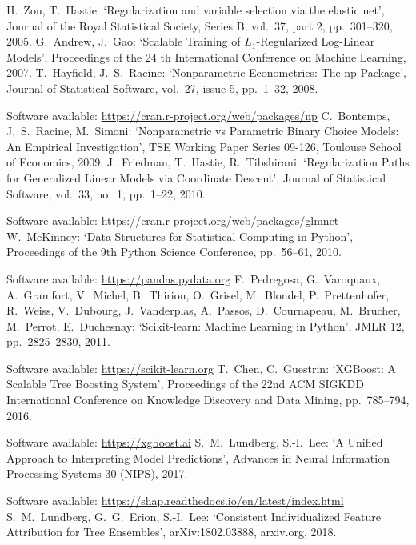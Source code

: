 \begin{thebibliography}{99}
%
H.\ Zou, T.\ Hastie: `Regularization and variable selection via the elastic net', Journal of the Royal Statistical Society, Series B, vol.\ 37, part 2, pp.\ 301--320, 2005.
%
G.\ Andrew, J.\ Gao: `Scalable Training of $L_1$-Regularized Log-Linear Models', Proceedings of the 24 th International Conference on Machine Learning, 2007.
%
T.\ Hayfield, J.\ S.\ Racine: `Nonparametric Econometrics: The np Package', Journal of Statistical Software, vol.\ 27, issue 5, pp.\ 1--32, 2008.\par
%
Software available: \url{https://cran.r-project.org/web/packages/np}
%
C.\ Bontemps, J.\ S.\ Racine, M.\ Simoni: `Nonparametric vs Parametric Binary Choice Models: An Empirical Investigation', TSE Working Paper Series 09-126, Toulouse School of Economics, 2009.
%
J.\ Friedman, T.\ Hastie, R.\ Tibshirani: `Regularization Paths for Generalized Linear Models via Coordinate Descent', Journal of Statistical Software, vol.\ 33, no.\ 1, pp.\ 1--22, 2010.\par
%
Software available: \url{https://cran.r-project.org/web/packages/glmnet}
%
W.\ McKinney: `Data Structures for Statistical Computing in Python', Proceedings of the 9th Python Science Conference, pp.\ 56--61, 2010.\par
%
Software available: \url{https://pandas.pydata.org}
%
F.\ Pedregosa, G.\ Varoquaux, A.\ Gramfort, V.\ Michel, B.\ Thirion, O.\ Grisel, M.\ Blondel, P.\ Prettenhofer, R.\ Weiss, V.\ Dubourg, J.\ Vanderplas, A.\ Passos, D.\ Cournapeau, M.\ Brucher, M.\ Perrot, E.\ Duchesnay: `Scikit-learn: Machine Learning in Python', JMLR 12, pp.\ 2825--2830, 2011.\par
%
Software available: \url{https://scikit-learn.org}
%
T.\ Chen, C.\ Guestrin: `XGBoost: A Scalable Tree Boosting System', Proceedings of the 22nd ACM SIGKDD International Conference on Knowledge Discovery and Data Mining, pp.\ 785--794, 2016.\par
%
Software available: \url{https://xgboost.ai}
%
S.\ M.\ Lundberg, S.-I.\ Lee: `A Unified Approach to Interpreting Model Predictions', Advances in Neural Information Processing Systems 30 (NIPS), 2017.\par
%
Software available: \url{https://shap.readthedocs.io/en/latest/index.html}
%
S.\ M.\ Lundberg, G.\ G.\ Erion, S.-I.\ Lee: `Consistent Individualized Feature Attribution for Tree Ensembles', arXiv:1802.03888, arxiv.org, 2018.

\end{thebibliography}
